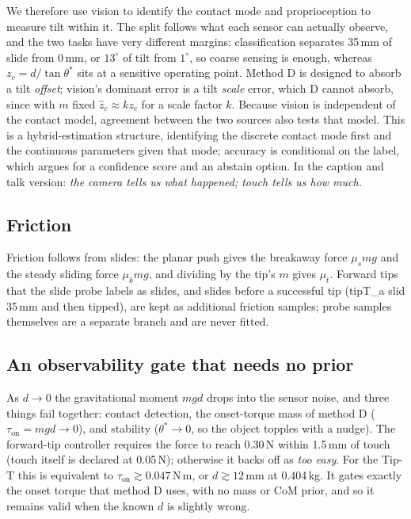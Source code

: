 \documentclass[10pt, conference]{IEEEtran}
\begin{document}
We therefore use vision to identify the contact mode and proprioception to measure tilt within it. The split follows what each sensor can actually observe, and the two tasks have very different margins: classification separates 35\,mm of slide from 0\,mm, or $13^\circ$ of tilt from $1^\circ$, so coarse sensing is enough, whereas $z_c = d/\tan\theta^{*}$ sits at a sensitive operating point. Method D is designed to absorb a tilt \emph{offset}; vision's dominant error is a tilt \emph{scale} error, which D cannot absorb, since with $m$ fixed $\hat z_c \approx k z_c$ for a scale factor $k$. Because vision is independent of the contact model, agreement between the two sources also tests that model. This is a hybrid-estimation structure, identifying the discrete contact mode first and the continuous parameters given that mode; accuracy is conditional on the label, which argues for a confidence score and an abstain option. In the caption and talk version: \emph{the camera tells us what happened; touch tells us how much.}

\subsection{Friction}
Friction follows from slides: the planar push gives the breakaway force $\mu_s m g$ and the steady sliding force $\mu_k m g$, and dividing by the tip's $m$ gives $\mu_t$. Forward tips that the slide probe labels as slides, and slides before a successful tip (tipT\_a slid 35\,mm and then tipped), are kept as additional friction samples; probe samples themselves are a separate branch and are never fitted.

\subsection{An observability gate that needs no prior}
As $d \to 0$ the gravitational moment $mgd$ drops into the sensor noise, and three things fail together: contact detection, the onset-torque mass of method D ($\tau_{\mathrm{on}} = mgd \rightarrow 0$), and stability ($\theta^{*} \rightarrow 0$, so the object topples with a nudge). The forward-tip controller requires the force to reach 0.30\,N within 1.5\,mm of touch (touch itself is declared at 0.05\,N); otherwise it backs off as \emph{too easy}. For the Tip-T this is equivalent to $\tau_{\mathrm{on}} \gtrsim 0.047$\,N\,m, or $d \gtrsim 12$\,mm at 0.404\,kg. It gates exactly the onset torque that method D uses, with no mass or CoM prior, and so it remains valid when the known $d$ is slightly wrong.
\end{document}
